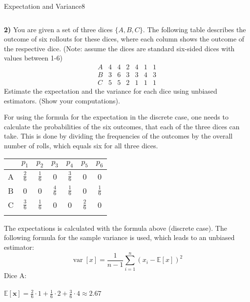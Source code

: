 \begin{questions}
\begin{question}{Expectation and Variance}{8}
\begin{answer}
\begin{equation}
\end{equation}
\end{answer}
\textbf{2)} You are given a set of three dices $\{A,B,C\}$.
The following table describes the outcome of six rollouts for these dices, where each column shows the outcome of the respective dice. 
(Note: assume the dices are standard six-sided dices with values between 1-6)
\begin{equation*}
\begin{array}{r|cccccc}
    A & 4 & 4 & 2 & 4 & 1 & 1 \\
    \hline
    B & 3 & 6 & 3 & 3 & 4 & 3 \\
    \hline
    C & 5 & 5 & 2 & 1 & 1 & 1 
\end{array}
\end{equation*}
Estimate the expectation and the variance for each dice using unbiased estimators. (Show your computations).
\begin{answer}
For using the formula for the expectation in the discrete case, one needs to calculate the probabilities of the six outcomes, that each of the three dices can take. This is done by dividing the frequencies of the outcomes by the overall number of rolls, which equals six for all three dices.\\ 
\begin{center}
\begin{tabular}{ c||c|c|c|c|c|c| } 
 & $p_{1}$ & $p_{2}$ & $p_{3}$ & $p_{4}$ & $p_{5}$ & $p_{6}$\\ 
 \hline
 \hline
 A & $\frac{2}{6}$ & $\frac{1}{6}$ & 0 & $\frac{3}{6}$ & 0 & 0 \\ 
 \hline
 B & 0 & 0 & $\frac{4}{6}$ & $\frac{1}{6}$ & 0 & $\frac{1}{6}$\\ 
 \hline
 C &  $\frac{3}{6}$ & $\frac{1}{6}$ & 0 & 0 & $\frac{2}{6}$  & 0 \\ 
 \hline \\
\end{tabular}
\end{center}
The expectations is calculated with the formula above (discrete case). The following formula for the sample variance is used, which leads to an unbiased estimator:\\
\begin{equation}
\operatorname{var}[x]=\frac{1}{n-1} \sum_{i=1}^{n}(x_{i}-\mathbb{E}\left[x\right])^{2}
\end{equation}
Dice A:\\ \\
$\mathbb{E}[ \mathbf{x}] = \frac{2}{6}\cdot1 + \frac{1}{6}\cdot2 + \frac{3}{6}\cdot4 \approx 2.67$\\

\end{answer}
\end{question}
\end{questions}
